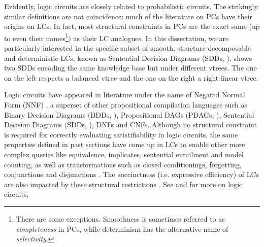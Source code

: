 Evidently, logic circuits are closely related to probabilistic circuits. The strikingly similar
definitions are not coincidence: much of the literature on PCs have their origins on LCs. In fact,
most structural constraints in PCs are the exact same (up to even their names\footnote{There are
some exceptions. Smoothness is sometimes referred to as \emph{completeness} in PCs, while
determinism has the alternative name of \emph{selectivity}.}) as their LC analogues. In this
dissertation, we are particularly interested in the specific subset of smooth, structure
decomposable and deterministic LCs, known as Sentential Decision Diagrams (SDDs,
\cite{darwiche11}).  shows two SDDs encoding the same knowledge base but under
different vtrees. The one on the left respects a balanced vtree and the one on the right a
right-linear vtree.

Logic circuits have appeared in literature under the name of Negated Normal Form (NNF)
\citep{darwiche01b,darwiche99}, a superset of other propositional compilation languages such as
Binary Decision Diagrams (BDDs, \cite{bryant86}), Propositional DAGs (PDAGs, \cite{wachter06}),
Sentential Decision Diagrams (SDDs, \cite{darwiche11}), DNFs and CNFs. Although no structural
constraint is required for correctly evaluating satistifiability in logic circuits, the same
properties defined in past sections have come up in LCs to enable other more complex queries like
equivalence, implicates, sentential entailment and model counting, as well as transformations such
as closed conditionings, forgetting, conjunctions and disjunctions \citep{darwiche02}. The
succinctness (i.e. expressive efficiency) of LCs are also impacted by these structural restrictions
\citep{gogic95,papadimitriou94,darwiche02}.  See \citet{darwiche02} and \citet{darwiche20} for more
on logic circuits.

